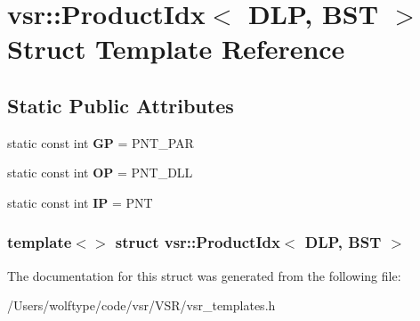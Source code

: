 \hypertarget{structvsr_1_1_product_idx_3_01_d_l_p_00_01_b_s_t_01_4}{\section{vsr\-:\-:Product\-Idx$<$ D\-L\-P, B\-S\-T $>$ Struct Template Reference}
\label{structvsr_1_1_product_idx_3_01_d_l_p_00_01_b_s_t_01_4}
}
\subsection*{Static Public Attributes}
\begin{DoxyCompactItemize}
\item 
\hypertarget{structvsr_1_1_product_idx_3_01_d_l_p_00_01_b_s_t_01_4_ab848a551754a9523e4cc9668fd88df50}{static const int {\bfseries G\-P} = P\-N\-T\-\_\-\-P\-A\-R}\label{structvsr_1_1_product_idx_3_01_d_l_p_00_01_b_s_t_01_4_ab848a551754a9523e4cc9668fd88df50}

\item 
\hypertarget{structvsr_1_1_product_idx_3_01_d_l_p_00_01_b_s_t_01_4_acc20d0362138dac99fda20e189228bf3}{static const int {\bfseries O\-P} = P\-N\-T\-\_\-\-D\-L\-L}\label{structvsr_1_1_product_idx_3_01_d_l_p_00_01_b_s_t_01_4_acc20d0362138dac99fda20e189228bf3}

\item 
\hypertarget{structvsr_1_1_product_idx_3_01_d_l_p_00_01_b_s_t_01_4_ae139a8b276120379b7dd79c9ca810546}{static const int {\bfseries I\-P} = P\-N\-T}\label{structvsr_1_1_product_idx_3_01_d_l_p_00_01_b_s_t_01_4_ae139a8b276120379b7dd79c9ca810546}

\end{DoxyCompactItemize}
\subsubsection*{template$<$$>$ struct vsr\-::\-Product\-Idx$<$ D\-L\-P, B\-S\-T $>$}



The documentation for this struct was generated from the following file\-:\begin{DoxyCompactItemize}
\item 
/\-Users/wolftype/code/vsr/\-V\-S\-R/vsr\-\_\-templates.\-h\end{DoxyCompactItemize}
